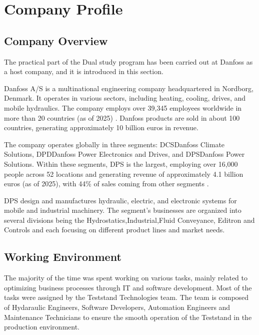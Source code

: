 \chapter{Company Profile}
\label{chap:company-profile}

\section{Company Overview}
The practical part of the Dual study program has been carried out at Danfoss as a host company, and it is introduced in this section.

Danfoss A/S is a multinational engineering company headquartered in Nordborg, Denmark. It operates in various sectors, including heating, cooling, drives, and mobile hydraulics. The company employs over 39,345 employees worldwide in more than 20 countries (as of 2025) \cite{DanfosAnnualReport2025}.
Danfoss products are sold in about 100 countries, generating approximately 10 billion euros in revenue.

The company operates globally in three segments: \ac{DCS}Danfoss Climate Solutions, \ac{DPD}Danfoss Power Electronics and Drives, and \ac{DPS}Danfoss Power Solutions. Within these segments, \ac{DPS} is the largest, employing over 16,000 people across 52 locations and generating revenue of approximately 4.1 billion euros (as of 2025), with 44\% of sales coming from other segments \cite{DanfossAnnualReport2025}.

\ac{DPS} design and manufactures hydraulic, electric, and electronic systems for mobile and industrial machinery. The segment's businesses are organized into several divisions being the Hydrostatics,Industrial,Fluid Conveyance, Editron and Controls and each focusing on different product lines and market needs. 



\section{Working Environment}

The majority of the time was spent working on various tasks, mainly related to optimizing business processes through \ac{IT} and software development. 
Most of the tasks were assigned by the Teststand Technologies team. The team is composed of Hydaraulic Engineers, Software Developers, Automation Engineers and Maintenance Technicians to ensure the smooth operation of the Teststand in the production environment.





